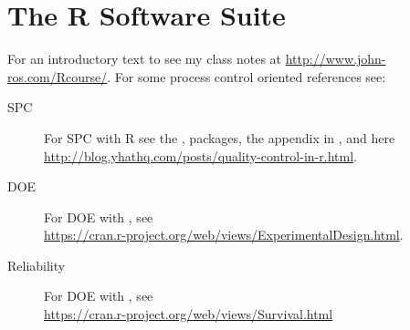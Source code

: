 


\chapter{The R Software Suite}
\label{apx:r}

For an introductory text to \R see my class notes at \url{http://www.john-ros.com/Rcourse/}.
For some process control oriented references see:
\begin{description}
\item [SPC] For SPC with R see the ,  packages, the appendix in \cite{qiu_introduction_2013}, and here \\ \url{http://blog.yhathq.com/posts/quality-control-in-r.html}.
\item [DOE] For DOE with \R, see \\ \url{https://cran.r-project.org/web/views/ExperimentalDesign.html}.
\item [Reliability] For DOE with \R, see \\ \url{https://cran.r-project.org/web/views/Survival.html}
\end{description}


